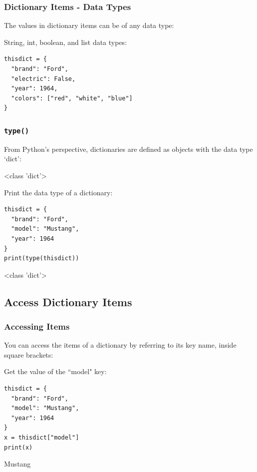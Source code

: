 \documentclass[12pt,a4paper]{article}
\newcommand{\lcode}[1]{%
	\lstinline{#1}%
}
\begin{document}
\subsubsection{Dictionary Items - Data Types}

The values in dictionary items can be of any data type:

\begin{ebox}
String, int, boolean, and list data types:
	\begin{lstlisting}
thisdict = {
  "brand": "Ford",
  "electric": False,
  "year": 1964,
  "colors": ["red", "white", "blue"]
}
	\end{lstlisting}
\end{ebox}
\subsubsection{\lcode{type()}}

From Python's perspective, dictionaries are defined as objects with the data
type `dict':

\begin{vercode}
 <class 'dict'>
\end{vercode}

\begin{ebox}
Print the data type of a dictionary:
	\begin{lstlisting}
thisdict = {
  "brand": "Ford",
  "model": "Mustang",
  "year": 1964
}
print(type(thisdict))
	\end{lstlisting}
\tcblower
	\begin{vercode}
<class 'dict'>
	\end{vercode}
\end{ebox}
\subsection{Access Dictionary Items}

\subsubsection{Accessing Items}

You can access the items of a dictionary by referring to its key name, inside
square brackets:

\begin{ebox}
Get the value of the ``model" key:
	\begin{lstlisting}
thisdict = {
  "brand": "Ford",
  "model": "Mustang",
  "year": 1964
}
x = thisdict["model"]
print(x)
	\end{lstlisting}
\tcblower
	\begin{vercode}
Mustang
	\end{vercode}
\end{ebox}
\end{document}
